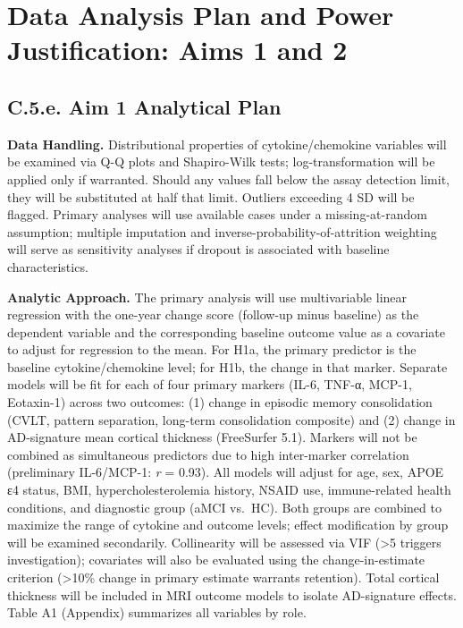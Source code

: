 \documentclass[
]{article}
\author{}
\date{\vspace{-2.5em}}
\begin{document}
\section{Data Analysis Plan and Power Justification: Aims 1 and
2}\label{data-analysis-plan-and-power-justification-aims-1-and-2}

\subsection{C.5.e. Aim 1 Analytical
Plan}\label{c.5.e.-aim-1-analytical-plan}

\textbf{Data Handling.} Distributional properties of cytokine/chemokine
variables will be examined via Q-Q plots and Shapiro-Wilk tests;
log-transformation will be applied only if warranted. Should any values
fall below the assay detection limit, they will be substituted at half
that limit. Outliers exceeding 4 SD will be flagged. Primary analyses
will use available cases under a missing-at-random assumption; multiple
imputation and inverse-probability-of-attrition weighting will serve as
sensitivity analyses if dropout is associated with baseline
characteristics.

\textbf{Analytic Approach.} The primary analysis will use multivariable
linear regression with the one-year change score (follow-up minus
baseline) as the dependent variable and the corresponding baseline
outcome value as a covariate to adjust for regression to the mean. For
H1a, the primary predictor is the baseline cytokine/chemokine level; for
H1b, the change in that marker. Separate models will be fit for each of
four primary markers (IL-6, TNF-α, MCP-1, Eotaxin-1) across two
outcomes: (1) change in episodic memory consolidation (CVLT, pattern
separation, long-term consolidation composite) and (2) change in
AD-signature mean cortical thickness (FreeSurfer 5.1). Markers will not
be combined as simultaneous predictors due to high inter-marker
correlation (preliminary IL-6/MCP-1: \emph{r} = 0.93). All models will
adjust for age, sex, APOE ε4 status, BMI, hypercholesterolemia history,
NSAID use, immune-related health conditions, and diagnostic group (aMCI
vs.~HC). Both groups are combined to maximize the range of cytokine and
outcome levels; effect modification by group will be examined
secondarily. Collinearity will be assessed via VIF (\textgreater5
triggers investigation); covariates will also be evaluated using the
change-in-estimate criterion (\textgreater10\% change in primary
estimate warrants retention). Total cortical thickness will be included
in MRI outcome models to isolate AD-signature effects. Table A1
(Appendix) summarizes all variables by role.
\end{document}
